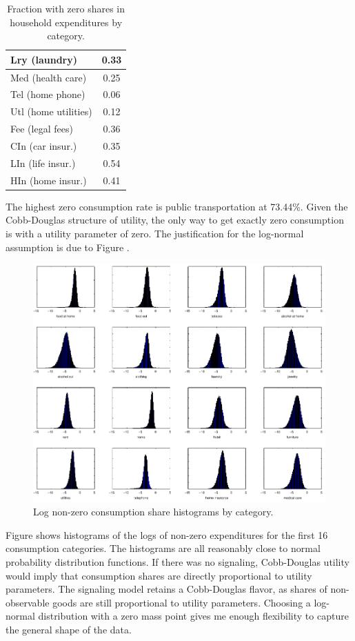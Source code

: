 \documentclass{article}
\begin{document}
\begin{table}
\begin{center}
\begin{tabular}{|l|c|}
	\hline
Lry (laundry) & 0.33 \\ 
	\hline
Med (health care) & 0.25 \\ 
	\hline
Tel (home phone) & 0.06 \\ 
	\hline
Utl (home utilities) & 0.12 \\ 
	\hline
Fee (legal fees) & 0.36 \\ 
	\hline
CIn (car insur.) & 0.35 \\ 
	\hline
LIn (life insur.) & 0.54 \\ 
	\hline
HIn (home insur.) & 0.41 \\ 
	\hline
\end{tabular}
\end{center}
\label{tab:sharetab}
\caption{Fraction with zero shares in household expenditures by category.}
\vspace{-2in}
\end{table}
The highest zero consumption rate is public transportation at 73.44\%.  
Given the Cobb-Douglas structure of utility, the only way to get exactly zero consumption is with a utility parameter of zero.
The justification for the log-normal assumption is due to Figure .
\begin{figure}
	\begin{center}
		\includegraphics[scale=1]{pics/shrplot_cropped.pdf}
	\end{center}
	\caption{Log non-zero consumption share histograms by category.}
	\label{fig:shrplot}
\end{figure}
Figure  shows histograms of the logs of non-zero expenditures for the first 16 consumption categories.  
The histograms are all reasonably close to normal probability distribution functions.
If there was no signaling, Cobb-Douglas utility would imply that consumption shares are directly proportional to utility parameters.
The signaling model retains a Cobb-Douglas flavor, as shares of non-observable goods are still proportional to utility parameters.
Choosing a log-normal distribution with a zero mass point gives me enough flexibility to capture the general shape of the data.
\end{document}

